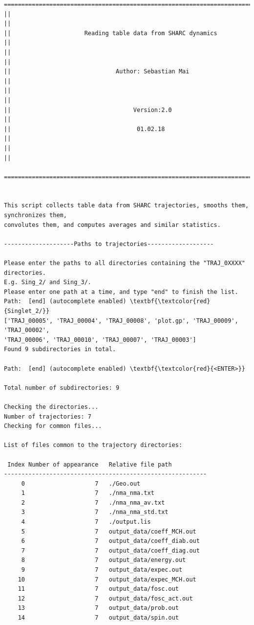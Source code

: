 \documentclass[a4paper,11pt,DIV=15,openany]{scrbook}
\begin{document}
\begin{oframed}
\footnotesize\begin{Verbatim}[commandchars=\\\{\}]
  ================================================================================
||                                                                                ||
||                     Reading table data from SHARC dynamics                     ||
||                                                                                ||
||                              Author: Sebastian Mai                             ||
||                                                                                ||
||                                   Version:2.0                                  ||
||                                    01.02.18                                    ||
||                                                                                ||
  ================================================================================


This script collects table data from SHARC trajectories, smooths them, synchronizes them,
convolutes them, and computes averages and similar statistics.
  
--------------------Paths to trajectories-------------------

Please enter the paths to all directories containing the "TRAJ_0XXXX" directories.
E.g. Sing_2/ and Sing_3/. 
Please enter one path at a time, and type "end" to finish the list.
Path:  [end] (autocomplete enabled) \textbf{\textcolor{red}{Singlet_2/}}
['TRAJ_00005', 'TRAJ_00004', 'TRAJ_00008', 'plot.gp', 'TRAJ_00009', 'TRAJ_00002', 
'TRAJ_00006', 'TRAJ_00010', 'TRAJ_00007', 'TRAJ_00003']
Found 9 subdirectories in total.

Path:  [end] (autocomplete enabled) \textbf{\textcolor{red}{<ENTER>}}

Total number of subdirectories: 9

Checking the directories...
Number of trajectories: 7
Checking for common files...

List of files common to the trajectory directories:

 Index Number of appearance   Relative file path
----------------------------------------------------------
     0                    7   ./Geo.out
     1                    7   ./nma_nma.txt
     2                    7   ./nma_nma_av.txt
     3                    7   ./nma_nma_std.txt
     4                    7   ./output.lis
     5                    7   output_data/coeff_MCH.out
     6                    7   output_data/coeff_diab.out
     7                    7   output_data/coeff_diag.out
     8                    7   output_data/energy.out
     9                    7   output_data/expec.out
    10                    7   output_data/expec_MCH.out
    11                    7   output_data/fosc.out
    12                    7   output_data/fosc_act.out
    13                    7   output_data/prob.out
    14                    7   output_data/spin.out


\end{Verbatim}
\end{oframed}
\end{document}
